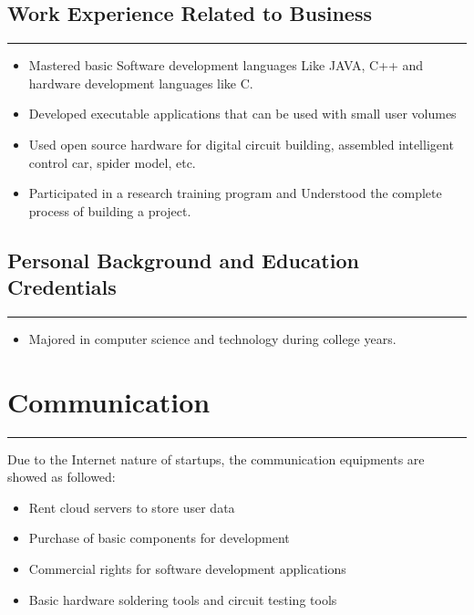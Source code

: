 \documentclass[12pt]{extarticle}
\numberwithin{figure}{section}
\begin{document}
\subsection{Work Experience Related to Business}
\vspace{-0.1cm}
\hrule
\vspace{0.2cm}
\begin{itemize}
    \setlength{\itemsep}{0pt}
          \setlength{\parsep}{0pt}
          \setlength{\parskip}{0pt}
    \item {\normalsize  Mastered basic Software development languages Like JAVA, C++ and hardware development languages like C.}
    \item  {\normalsize Developed executable applications that can be used with small user volumes}
    \item  {\normalsize Used open source hardware for digital circuit building, assembled intelligent control car, spider model, etc.}
    \item  {\normalsize Participated in a research training program and Understood the complete process of building a project.}
\end{itemize}
\subsection{Personal Background and Education Credentials}
\vspace{-0.1cm}
\hrule
\vspace{0.2cm}
\begin{itemize}
    \setlength{\itemsep}{0pt}
          \setlength{\parsep}{0pt}
          \setlength{\parskip}{0pt}
    \item {\normalsize Majored in computer science and technology during college years.}
\end{itemize}

\newpage
\section{Communication}
\vspace{-0.1cm}
\hrule
\vspace{0.2cm}
Due to the Internet nature of startups, the communication equipments are showed as followed:
\begin{itemize}
    \setlength{\itemsep}{0pt}
          \setlength{\parsep}{0pt}
          \setlength{\parskip}{0pt}
    \item {Rent cloud servers to store user data}
    \item {Purchase of basic components for development}
    \item {Commercial rights for software development applications}
    \item {Basic hardware soldering tools and circuit testing tools}
\end{itemize}
\end{document}
